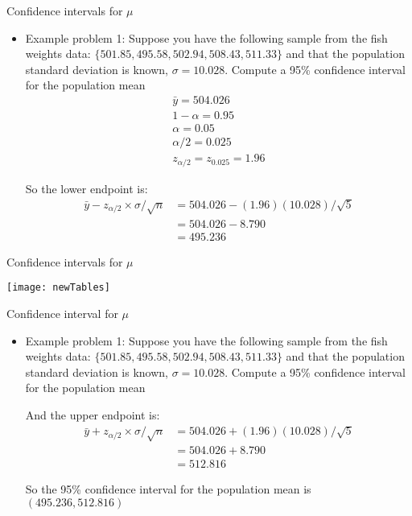 \documentclass[xcolor=dvipsnames]{beamer}
\begin{document}
\begin{frame}{Confidence intervals for $\mu$}
	\begin{itemize}
		\item Example problem 1: Suppose you have the following sample from the fish weights data: $\{501.85, 495.58, 502.94, 508.43, 511.33 \}$ and that the population standard deviation is known, $\sigma = 10.028$. Compute a 95\% confidence interval for the population mean  \pause
		\begin{gather*}
			\bar{y} = 504.026 \\
			1 - \alpha = 0.95 \\
			\alpha = 0.05 \\
			\alpha / 2 = 0.025 \\
			z_{\alpha / 2} = z_{0.025} = 1.96 
		\end{gather*}  \pause
		
		So the lower endpoint is:  \pause
		\begin{align*}
			\bar{y} - z_{\alpha / 2} \times \sigma / \sqrt{n} &= 504.026 - (1.96)(10.028)/\sqrt{5} \\
			&= 504.026 - 8.790 \\
			&= 495.236
		\end{align*}
	\end{itemize}
\end{frame}

\begin{frame}{Confidence intervals for $\mu$}
	\begin{center}
		\texttt{[image: newTables]}
	\end{center}
\end{frame}

\begin{frame}{Confidence interval for $\mu$}
	\begin{itemize}
		\item Example problem 1: Suppose you have the following sample from the fish weights data: $\{501.85, 495.58, 502.94, 508.43, 511.33 \}$ and that the population standard deviation is known, $\sigma = 10.028$. Compute a 95\% confidence interval for the population mean\\ \vspace{10pt}
		
		And the upper endpoint is:  \pause
		\begin{align*}
		\bar{y} + z_{\alpha / 2} \times \sigma / \sqrt{n} &= 504.026 + (1.96)(10.028)/\sqrt{5} \\
		&= 504.026 + 8.790 \\
		&= 512.816
		\end{align*}  \pause
		
		So the 95\% confidence interval for the population mean is $(495.236, 512.816)$
	\end{itemize}
\end{frame}
\end{document}
